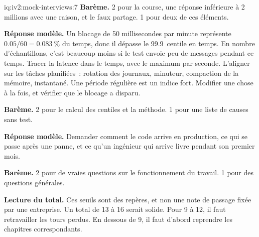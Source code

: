 \begin{solution}{iq:iv2:mock-interviews:7}
\textbf{Barème.} 2 pour la course, une réponse inférieure à 2 millions avec une raison, et le faux partage. 1 pour deux de ces éléments.

\ivstop
\textbf{Réponse modèle.} Un blocage de 50 millisecondes par minute représente $0.05/60 = 0.083~\%$ du temps, donc il dépasse le 99.9~centile en temps. En nombre d'échantillons, c'est beaucoup moins si le test envoie peu de messages pendant ce temps. Tracer la latence dans le temps, avec le maximum par seconde. L'aligner sur les tâches planifiées~: rotation des journaux, minuteur, compaction de la mémoire, instantané. Une période régulière est un indice fort. Modifier une chose à la fois, et vérifier que le blocage a disparu.

\textbf{Barème.} 2 pour le calcul des centiles et la méthode. 1 pour une liste de causes sans test.

\ivstop
\textbf{Réponse modèle.} Demander comment le code arrive en production, ce qui se passe après une panne, et ce qu'un ingénieur qui arrive livre pendant son premier mois.

\textbf{Barème.} 2 pour de vraies questions sur le fonctionnement du travail. 1 pour des questions générales.

\medskip
\textbf{Lecture du total.} Ces seuils sont des repères, et non une note de passage fixée par une entreprise. Un total de 13 à 16 serait solide. Pour 9 à 12, il faut retravailler les tours perdus. En dessous de 9, il faut d'abord reprendre les chapitres correspondants.

\end{solution}

